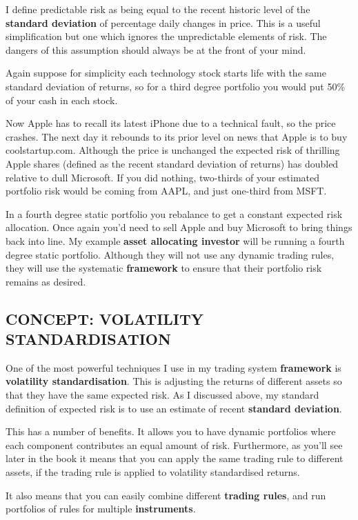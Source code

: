 I define predictable risk as being equal to the recent historic level of the \textbf{standard deviation} of percentage daily changes in price. This is a useful simplification but one which ignores the unpredictable elements of risk. The dangers of this assumption should always be at the front of your mind.

Again suppose for simplicity each technology stock starts life with the same standard deviation of returns, so for a third degree portfolio you would put 50\% of your cash in each stock.

Now Apple has to recall its latest iPhone due to a technical fault, so the price crashes. The next day it rebounds to its prior level on news that Apple is to buy coolstartup.com. Although the price is unchanged the expected risk of thrilling Apple shares (defined as the recent standard deviation of returns) has doubled relative to dull Microsoft. If you did nothing, two-thirds of your estimated portfolio risk would be coming from AAPL, and just one-third from MSFT.

In a fourth degree static portfolio you rebalance to get a constant expected risk allocation. Once again you'd need to sell Apple and buy Microsoft to bring things back into line.
My example \textbf{asset allocating investor} will be running a fourth degree static portfolio. Although they will not use any dynamic trading rules, they will use the systematic \textbf{framework} to ensure that their portfolio risk remains as desired.

\subsection*{CONCEPT: VOLATILITY STANDARDISATION}

One of the most powerful techniques I use in my trading system \textbf{framework} is \textbf{volatility standardisation}. This is adjusting the returns of different assets so that they have the same expected risk. As I discussed above, my standard definition of expected risk is to use an estimate of recent \textbf{standard deviation}.

This has a number of benefits. It allows you to have dynamic portfolios where each component contributes an equal amount of risk. Furthermore, as you'll see later in the book it means that you can apply the same trading rule to different assets, if the trading rule is applied to volatility standardised returns.

It also means that you can easily combine different \textbf{trading rules}, and run portfolios of rules for multiple \textbf{instruments}.

